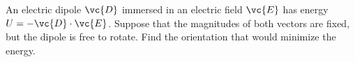 An electric dipole $\vc{D}$ immersed in an electric field $\vc{E}$
has energy $U=-\vc{D}\cdot\vc{E}$. Suppose that the magnitudes of both
vectors are fixed, but the dipole is free to rotate.  Find the orientation
that would minimize the energy.
